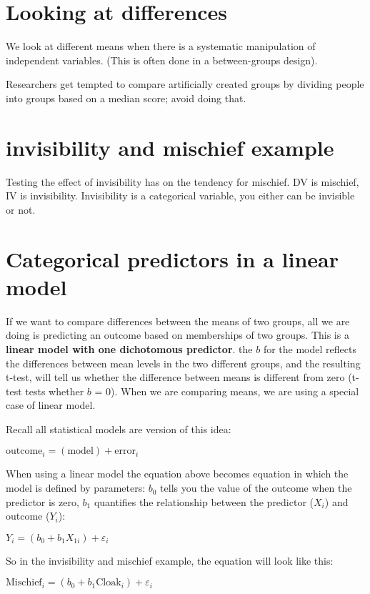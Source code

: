 
\section{Looking at differences}
We look at different means when there is a systematic manipulation of independent variables.  (This is often done in a between-groups design). 

Researchers get tempted to compare artificially created groups by dividing people into groups based on a median score; avoid doing that. 

\section{invisibility and mischief example}
Testing the effect of invisibility has on the tendency for mischief. DV is mischief, IV is invisibility. Invisibility is a categorical variable, you either can be invisible or not. 
\section{Categorical predictors in a linear model}
If we want to compare differences between the means of two groups, all we are doing is predicting an outcome based on memberships of two groups. This is a \textbf{linear model with one dichotomous predictor}. the $b$ for the model reflects the differences between mean levels in the two different groups, and the resulting t-test, will tell us whether the difference between means is different from zero (t-test tests whether $b$ = 0). When we are comparing means, we are using a special case of linear model.

Recall all statistical models are version of this idea: 

\begin{center}
$\text{outcome}_i = (\text{model}) + \text{error}_i$
\end{center}

When using a linear model the equation above becomes equation in which the model is defined by parameters: $b_0$ tells you the value of the outcome when the predictor is zero, $b_1$ quantifies the relationship between the predictor ($X_i$) and outcome ($Y_i$):

\begin{center}
$Y_i = (b_0 + b_{1}X_{1i}) + \varepsilon_i$
\end{center}

So in the invisibility and mischief example, the equation will look like this:
\begin{center}
$\text{Mischief}_i = (b_0 + b_{1}\text{Cloak}_i) + \varepsilon_i$
\end{center}

